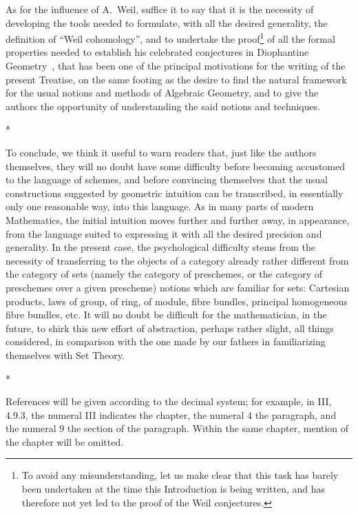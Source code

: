 As for the influence of A.~Weil, suffice it to say that it is the necessity of developing the tools needed to formulate, with all the desired generality, the definition of ``Weil cohomology'', and to undertake the proof\footnote{To avoid any misunderstanding, let us make clear that this task has barely been undertaken at the time this Introduction is being written, and has therefore not yet led to the proof of the Weil conjectures.} of all the formal properties needed to establish his celebrated conjectures in Diophantine Geometry~\cite{I-19}, that has been one of the principal motivations for the writing of the present Treatise, on the same footing as the desire to find the natural framework for the usual notions and methods of Algebraic Geometry, and to give the authors the opportunity of understanding the said notions and techniques.

\bigskip
\begin{center}*\quad*\quad*\end{center}
\bigskip

To conclude, we think it useful to warn readers that, just like the authors themselves, they will no doubt have some difficulty before becoming accustomed to the language of schemes, and before convincing themselves that the usual constructions suggested by geometric intuition can be transcribed, in essentially only one reasonable way, into this language.
As in many parts of modern Mathematics, the initial intuition moves further and further away, in appearance, from the language suited to expressing it with all the desired precision and generality.
In the present case, the psychological difficulty stems from the necessity of transferring to the objects of a category already rather different from the category of sets (namely the category of preschemes, or the category of preschemes over a given prescheme) notions which are familiar for sets: Cartesian products, laws of group, of ring, of module, fibre bundles, principal homogeneous fibre bundles, etc.
It will no doubt be difficult for the mathematician, in the future, to shirk this new effort of abstraction, perhaps rather slight, all things considered, in comparison with the one made by our fathers in familiarizing themselves with Set Theory.

\bigskip
\begin{center}*\quad*\quad*\end{center}
\bigskip

References will be given according to the decimal system; for example, in III, 4.9.3, the numeral III indicates the chapter, the numeral 4 the paragraph, and the numeral 9 the section of the paragraph.
Within the same chapter, mention of the chapter will be omitted.
